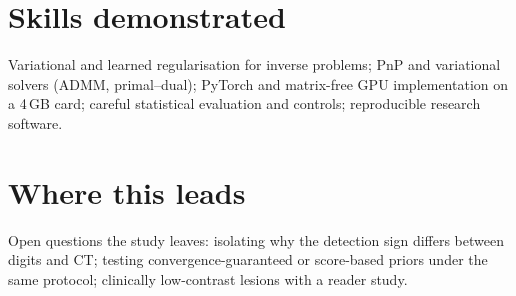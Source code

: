 \documentclass[10pt,a4paper]{article}
\begin{document}
\section*{Skills demonstrated}
Variational and learned regularisation for inverse problems; PnP and variational solvers (ADMM, primal--dual); PyTorch and matrix-free GPU implementation on a 4\,GB card; careful statistical evaluation and controls; reproducible research software.

\section*{Where this leads}
Open questions the study leaves: isolating why the detection sign differs between digits and CT; testing convergence-guaranteed or score-based priors under the same protocol; clinically low-contrast lesions with a reader study.
\end{document}
